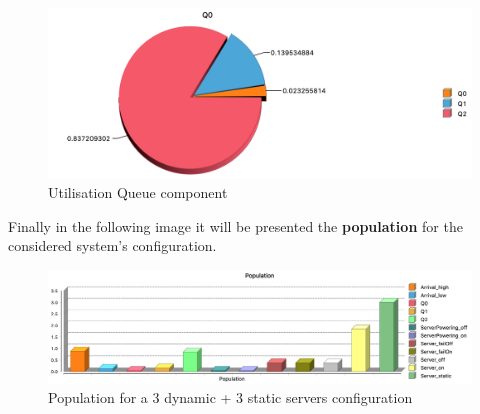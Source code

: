 \documentclass{article}
\begin{document}
\begin{figure}[H]
    \centering
    \includegraphics[width=16.5cm]{utilisation-queue.png}
    \caption{Utilisation Queue component}
    \label{fig:utilisation-queue}
\end{figure}

\noindent Finally in the following image it will be presented the \textbf{population} for the considered system's configuration.

\begin{figure}[H]
 \centering
    \includegraphics[width=16.5cm]{population-graph.png}
    \caption{Population for a 3 dynamic + 3 static servers configuration}
    \label{fig:population-graph}
\end{figure}

\newpage

\raggedright

\end{document}
